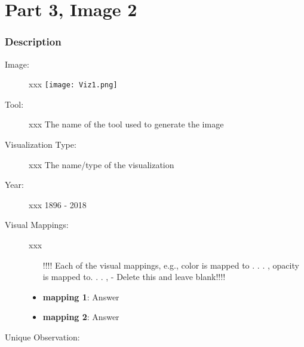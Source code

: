 \hypertarget{part--image-2}{%
\section{Part 3, Image 2}\label{part-1-design-5}}


\centering


\hypertarget{description}{%
	\subsubsection{Description}\label{description}}

\begin{description}
	\item[Image:] xxx
	\texttt{[image: Viz1.png]}
	\item[Tool:] xxx
	The name of the tool used to generate the image
	\item[Visualization Type:] xxx
	The name/type of the visualization
	\item[Year:] xxx
	1896 - 2018
	\item[Visual Mappings:] xxx
	\begin{itemize}
		\tightlist
		\item[ !!!! Each of the visual mappings, e.g., color is mapped to . . . ,
		opacity is mapped to. . . , - Delete this and leave blank!!!! ] 
	\end{itemize}
	\begin{itemize}
		\tightlist
		\item
		\textbf{mapping 1}: Answer
	\end{itemize}
	
	\begin{itemize}
		\tightlist
		\item
		\textbf{mapping 2}: Answer
	\end{itemize}
	\item[Unique Observation:]
	
\end{description}
